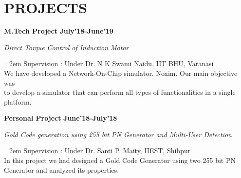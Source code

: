 \documentclass[paper=a4,fontsize=11pt]{scrartcl} %
\newcommand{\sepspace}{\vspace*{1em}}		%
\newcommand{\NewPart}[1]{\section*{\uppercase{#1}}}
\newcommand{\EducationEntry}[4]{
		\noindent \textbf{#1} \hfill      %
		\textbf{#2} \par  %
		\noindent \textit{#3} \par        %
		\noindent\hangindent=2em\hangafter=0 \small #4 %
		\normalsize \par}
\newcommand{\WorkEntry}[4]{				  %
		\noindent \textbf{#1} \hfill      %
		\textbf{#2} \par  %
		\noindent \textit{#3} \par              %
		\noindent\hangindent=2em\hangafter=0 \small #4 %
		\normalsize \par}
\begin{document}
    \NewPart{Projects}
    {}
        \WorkEntry{M.Tech Project} %
            {July'18-June'19} %
            {Direct Torque Control of Induction Motor} %
            {
                Supervision : Under Dr. N K Swami Naidu, IIT BHU, Varanasi\\We have developed a Network-On-Chip simulator, Noxim. Our main objective was \\to develop a simulator that can perform all types of functionalities in a single platform.%
            }
        \sepspace
        \sepspace
        \WorkEntry{Personal Project} %
            {June'18-July'18} %
            {Gold Code generation using 255 bit PN Generator and Multi-User Detection} %
            {
                Supervision : Under Dr. Santi P. Maity, IIEST, Shibpur\\In this project we had designed a Gold Code Generator using two 255 bit PN Generator and analyzed its properties.%
            }
\end{document}
